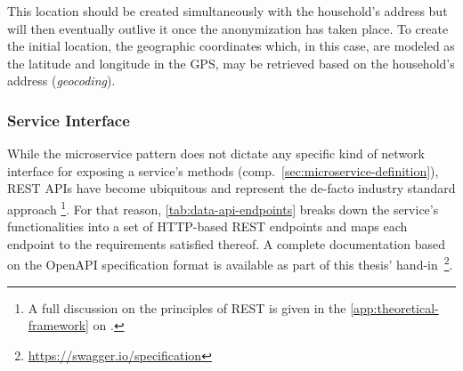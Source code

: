 This location should be created simultaneously with the household's address but will then eventually outlive it once the anonymization has taken place. To create the initial location, the geographic coordinates which, in this case, are modeled as the latitude and longitude in the \ac{GPS}, may be retrieved based on the household's address (\textit{geocoding}).


\subsubsection{Service Interface}
\label{sec:data-api-service-interface}

While the microservice pattern does not dictate any specific kind of network interface for exposing a service's methods (comp.~\autoref{sec:microservice-definition}), \acs{REST} \acsp{API} have become ubiquitous and represent the de-facto industry standard approach \footnote{A full discussion on the principles of \acs{REST} is given in the \autoref{app:theoretical-framework} on .}. For that reason, \autoref{tab:data-api-endpoints} breaks down the service's functionalities into a set of \acs{HTTP}-based \acs{REST} endpoints and maps each endpoint to the requirements satisfied thereof. A complete documentation based on the OpenAPI specification format is available as part of this thesis' hand-in~\footnote{\url{https://swagger.io/specification}}.


